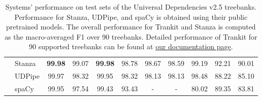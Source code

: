 \documentclass[11pt,a4paper]{article}
\begin{document}
\begin{table*}[ht]
{\begin{tabular}{l|l|c|c|c|c|c|c|c|c|c}
                                        & Stanza                      & \textbf{99.98} & 99.07          & \textbf{99.98} & 98.78          & 98.67          & 98.59          & 99.19          & 92.21          & 90.01          \\ \cline{2-11} 
                                        & UDPipe                      & 99.97          & 98.32          & 99.95          & 98.32          & 98.13          & 98.13          & 98.48          & 88.22          & 85.10          \\ \cline{2-11} 
                                        & spaCy                       & 99.95          & 97.54          & 99.43          & 93.43          & -              & -              & 80.02          & 89.35          & 83.81          \\ \end{tabular}}

\caption{Systems' performance on test sets of the Universal Dependencies v2.5 treebanks. Performance for Stanza, UDPipe, and spaCy is obtained using their public pretrained models. The overall performance for Trankit and Stanza is computed as the macro-averaged F1 over 90 treebanks. Detailed performance of Trankit for 90 supported treebanks can be found at \href{https://trankit.readthedocs.io/en/latest/performance.html}{our documentation page}.}
\label{tab:ud-performance}
\end{table*}







\vspace{0.3cm}
\end{document}
